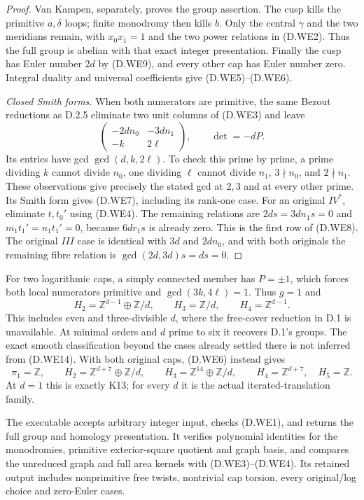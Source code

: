 \begin{proof}
Van Kampen, separately, proves the group assertion.
The cusp kills the primitive $a,\delta$ loops;
finite monodromy then kills $b$. Only the central
$\gamma$ and the two meridians remain, with
$x_0x_1=1$ and the two power relations in (D.WE2).
Thus the full group is abelian with that exact
integer presentation. Finally the cusp has Euler
number $2d$ by (D.WE9), and every other cap has
Euler number zero. Integral duality and universal
coefficients give (D.WE5)--(D.WE6).

\emph{Closed Smith forms.}
When both numerators are primitive, the same
Bezout reductions as D.2.5 eliminate two unit
columns of (D.WE3) and leave
\[
 \begin{pmatrix}
 -2dn_0&-3dn_1\\-k&2\ell
 \end{pmatrix},\qquad \det=-dP .
\]
Its entries have gcd $\gcd(d,k,2\ell)$.
To check this prime by prime, a prime dividing
$k$ cannot divide $n_0$, one dividing $\ell$
cannot divide $n_1$, $3\nmid n_0$, and $2\nmid n_1$.
These observations give precisely the stated gcd
at $2,3$ and at every other prime. Its Smith
form gives (D.WE7), including its rank-one case.
For an original $IV^*$, eliminate $t,t_0'$ using
(D.WE4). The remaining relations are
$2ds=3dn_1s=0$ and
$m_1t_1'=n_1t_1'=0$, because $6dr_1s$ is already
zero. This is the first row of (D.WE8).
The original $III$ case is identical with
$3d$ and $2dn_0$, and with both originals the
remaining fibre relation is $\gcd(2d,3d)s=ds=0$.
\end{proof}

For two logarithmic caps, a simply connected member
has $P=\pm1$, which forces both local numerators
primitive and $\gcd(3k,4\ell)=1$. Thus $g=1$ and
\[
 H_2=\mathbb Z^{d-1}\oplus\mathbb Z/d,\qquad
 H_3=\mathbb Z/d,\qquad H_4=\mathbb Z^{d-1}.                \tag{D.WE14}
\]
This includes even and three-divisible $d$, where the
free-cover reduction in D.1 is unavailable. At minimal
orders and $d$ prime to six it recovers D.1's groups.
The exact smooth classification beyond the cases
already settled there is not inferred from (D.WE14).
With both original caps, (D.WE6) instead gives
\[
 \pi_1=\mathbb Z,\qquad
 H_2=\mathbb Z^{d+7}\oplus\mathbb Z/d,\qquad
 H_3=\mathbb Z^{14}\oplus\mathbb Z/d,\qquad
 H_4=\mathbb Z^{d+7},\quad H_5=\mathbb Z.
\]
At $d=1$ this is exactly K13; for every $d$ it is the
actual iterated-translation family.

The executable 
accepts arbitrary integer input, checks (D.WE1), and
returns the full group and homology presentation.
It verifies polynomial identities for the monodromies,
primitive exterior-square quotient and graph basis,
and compares the unreduced graph and full area kernels
with (D.WE3)--(D.WE4). Its retained output includes
nonprimitive free twists, nontrivial cap torsion,
every original/log choice and zero-Euler cases.
